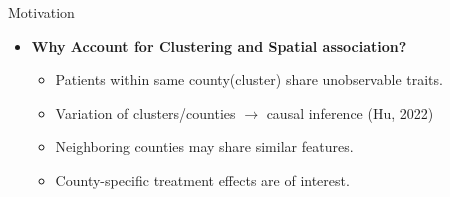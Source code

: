 \documentclass{beamer}
\begin{document}
\begin{frame}{ Motivation }
    \begin{itemize}
      \vfill \item \textbf{Why Account for Clustering and Spatial association?}
      \begin{itemize}
        \vfill \item Patients within same county(cluster) share unobservable traits.
        \vfill \item Variation of clusters/counties $\rightarrow$ causal inference (Hu, 2022)
        \vfill \item Neighboring counties may share similar features.
        \vfill \item County-specific treatment effects are of interest.
      \end{itemize}
    \end{itemize}
    \end{frame}
\end{document}
